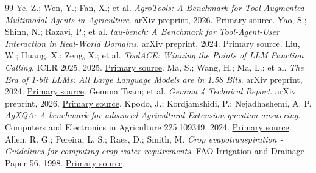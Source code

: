 \documentclass[14pt,a4paper]{extarticle}
\begin{document}
\begin{thebibliography}{99}
Ye, Z.; Wen, Y.; Fan, X.; et al. \emph{AgroTools: A Benchmark for Tool-Augmented Multimodal Agents in Agriculture}. arXiv preprint, 2026. \href{https://arxiv.org/abs/2605.22366}{Primary source}.
Yao, S.; Shinn, N.; Razavi, P.; et al. \emph{tau-bench: A Benchmark for Tool-Agent-User Interaction in Real-World Domains}. arXiv preprint, 2024. \href{https://arxiv.org/abs/2406.12045}{Primary source}.
Liu, W.; Huang, X.; Zeng, X.; et al. \emph{ToolACE: Winning the Points of LLM Function Calling}. ICLR 2025, 2025. \href{https://proceedings.iclr.cc/paper_files/paper/2025/hash/663865ea167425c6c562cb0b6bcf76c7-Abstract-Conference.html}{Primary source}.
Ma, S.; Wang, H.; Ma, L.; et al. \emph{The Era of 1-bit LLMs: All Large Language Models are in 1.58 Bits}. arXiv preprint, 2024. \href{https://arxiv.org/abs/2402.17764}{Primary source}.
Gemma Team; et al. \emph{Gemma 4 Technical Report}. arXiv preprint, 2026. \href{https://arxiv.org/abs/2607.02770}{Primary source}.
Kpodo, J.; Kordjamshidi, P.; Nejadhashemi, A. P. \emph{AgXQA: A benchmark for advanced Agricultural Extension question answering}. Computers and Electronics in Agriculture 225:109349, 2024. \href{https://doi.org/10.1016/j.compag.2024.109349}{Primary source}.
Allen, R. G.; Pereira, L. S.; Raes, D.; Smith, M. \emph{Crop evapotranspiration - Guidelines for computing crop water requirements}. FAO Irrigation and Drainage Paper 56, 1998. \href{https://www.fao.org/4/x0490e/x0490e00.htm}{Primary source}.
\end{thebibliography}
\end{document}
